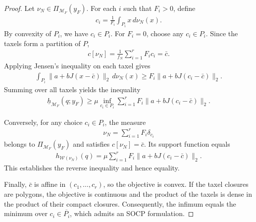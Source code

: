 \documentclass[11pt,a4paper]{article}
\theoremstyle{proposition}
\begin{document}
\begin{proof}
    Let $\nu_N\in\Pi_{\mathcal M_F}(y_F)$. For each $i$ such that $F_i>0$, define
    \begin{align}
        c_i=\frac{1}{F_i}\int_{P_i}x\,d\nu_N(x).
    \end{align}
    By convexity of $P_i$, we have $c_i\in P_i$. For $F_i=0$, choose any $c_i\in P_i$.
    Since the taxels form a partition of $P$,
    \begin{align}
        c[\nu_N]
        =
        \frac{1}{f_N}\sum_{i=1}^rF_ic_i
        =\bar c.
    \end{align}
    Applying Jensen's inequality on each taxel gives
    \begin{align}
        \int_{P_i}
        \|a+bJ(x-\bar c)\|_2\,d\nu_N(x)
        \geq
        F_i\|a+bJ(c_i-\bar c)\|_2.
    \end{align}
    Summing over all taxels yields the inequality
    \begin{align}
        \underline h_{\mathcal M_F}(q;y_F)
        \geq
        \mu\inf_{c_i\in P_i}
        \sum_{i=1}^rF_i\|a+bJ(c_i-\bar c)\|_2.
    \end{align}

    Conversely, for any choice $c_i\in P_i$, the measure
    \begin{align}
        \nu_N=\sum_{i=1}^rF_i\delta_{c_i}
    \end{align}
    belongs to $\Pi_{\mathcal M_F}(y_F)$ and satisfies
    $c[\nu_N]=\bar c$. Its support function equals
    \begin{align}
        h_{\mathcal W(\nu_N)}(q)
        =
        \mu\sum_{i=1}^r
        F_i\|a+bJ(c_i-\bar c)\|_2.
    \end{align}
    This establishes the reverse inequality and hence equality.

    Finally, $\bar c$ is affine in $(c_1,\ldots,c_r)$,
    so the objective is convex.
    If the taxel closures are polygons, the objective is
    continuous and the product of the taxels is dense in
    the product of their compact closures.
    Consequently, the infimum equals the minimum over
    $c_i\in\overline{P_i}$, which admits an SOCP formulation.
\end{proof}
\end{document}
